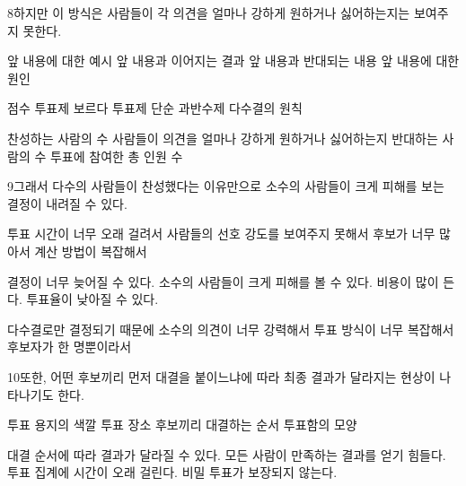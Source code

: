 \documentclass[fs85,seriesRus]{korfarm-base}
\begin{document}
\begin{kfSentenceUnit}{8}{하지만 이 방식은 사람들이 각 의견을 얼마나 강하게 원하거나 싫어하는지는 보여주지 못한다.}
\begin{kfChoices}
\kfChoice 앞 내용에 대한 예시
\kfChoice 앞 내용과 이어지는 결과
\kfChoice 앞 내용과 반대되는 내용
\kfChoice 앞 내용에 대한 원인
\end{kfChoices}
\begin{kfChoices}
\kfChoice 점수 투표제
\kfChoice 보르다 투표제
\kfChoice 단순 과반수제
\kfChoice 다수결의 원칙
\end{kfChoices}
\begin{kfChoices}
\kfChoice 찬성하는 사람의 수
\kfChoice 사람들이 의견을 얼마나 강하게 원하거나 싫어하는지
\kfChoice 반대하는 사람의 수
\kfChoice 투표에 참여한 총 인원 수
\end{kfChoices}
\end{kfSentenceUnit}

\begin{kfSentenceUnit}{9}{그래서 다수의 사람들이 찬성했다는 이유만으로 소수의 사람들이 크게 피해를 보는 결정이 내려질 수 있다.}
\begin{kfChoices}
\kfChoice 투표 시간이 너무 오래 걸려서
\kfChoice 사람들의 선호 강도를 보여주지 못해서
\kfChoice 후보가 너무 많아서
\kfChoice 계산 방법이 복잡해서
\end{kfChoices}
\begin{kfChoices}
\kfChoice 결정이 너무 늦어질 수 있다.
\kfChoice 소수의 사람들이 크게 피해를 볼 수 있다.
\kfChoice 비용이 많이 든다.
\kfChoice 투표율이 낮아질 수 있다.
\end{kfChoices}
\begin{kfChoices}
\kfChoice 다수결로만 결정되기 때문에
\kfChoice 소수의 의견이 너무 강력해서
\kfChoice 투표 방식이 너무 복잡해서
\kfChoice 후보자가 한 명뿐이라서
\end{kfChoices}
\end{kfSentenceUnit}

\begin{kfSentenceUnit}{10}{또한, 어떤 후보끼리 먼저 대결을 붙이느냐에 따라 최종 결과가 달라지는 현상이 나타나기도 한다.}
\begin{kfChoices}
\kfChoice 투표 용지의 색깔
\kfChoice 투표 장소
\kfChoice 후보끼리 대결하는 순서
\kfChoice 투표함의 모양
\end{kfChoices}
\begin{kfChoices}
\kfChoice 대결 순서에 따라 결과가 달라질 수 있다.
\kfChoice 모든 사람이 만족하는 결과를 얻기 힘들다.
\kfChoice 투표 집계에 시간이 오래 걸린다.
\kfChoice 비밀 투표가 보장되지 않는다.
\end{kfChoices}
\end{kfSentenceUnit}
\end{document}
